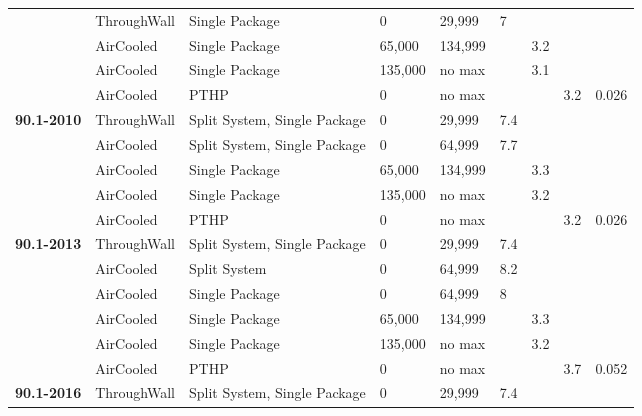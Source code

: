 \begin{table}[h!]
\begin{tabular}{|p{0.4in}|p{0.5in}|p{0.75in}|p{0.4in}|p{0.4in}|p{0.4in}|p{0.4in}|p{0.4in}|p{0.4in}|}
& ThroughWall               & Single Package                & 0       & 29,999    & 7   &     &     & \\ \cline{2-9} 
& AirCooled                 & Single Package                & 65,000  & 134,999   &     & 3.2 &     & \\ \cline{2-9} 
& AirCooled                 & Single Package                & 135,000 & no max    &     & 3.1 &     & \\ \cline{2-9} 
& AirCooled                 & PTHP                          & 0       & no max    &     &     & 3.2 & 0.026 \\ \hline
\multirow{5}{*}{\textbf{90.1-2010}} 
& ThroughWall               & Split System, Single Package  & 0 & 29,999 & 7.4 & & & \\ \cline{2-9} 
& AirCooled                 & Split System, Single Package  & 0       & 64,999    & 7.7 &     &     & \\ \cline{2-9} 
& AirCooled                 & Single Package                & 65,000  & 134,999   &     & 3.3 &     & \\ \cline{2-9} 
& AirCooled                 & Single Package                & 135,000 & no max    &     & 3.2 &     & \\ \cline{2-9} 
& AirCooled                 & PTHP                          & 0       & no max    &     &     & 3.2 & 0.026 \\ \hline
\multirow{6}{*}{\textbf{90.1-2013}} & ThroughWall & Split   System, Single Package & 0       & 29,999    & 7.4 &     &     &       \\ \cline{2-9} 
                                    & AirCooled   & Split   System                 & 0       & 64,999    & 8.2 &     &     &       \\ \cline{2-9} 
                                    & AirCooled   & Single   Package               & 0       & 64,999    & 8   &     &     &       \\ \cline{2-9} 
                                    & AirCooled   & Single   Package               & 65,000  & 134,999   &     & 3.3 &     &       \\ \cline{2-9} 
                                    & AirCooled   & Single   Package               & 135,000 & no max    &     & 3.2 &     &       \\ \cline{2-9} 
                                    & AirCooled   & PTHP                           & 0       & no max    &     &     & 3.7 & 0.052 \\ \hline
\multirow{6}{*}{\textbf{90.1-2016}} & ThroughWall & Split   System, Single Package & 0       & 29,999    & 7.4 &     &     &       \\ \cline{2-9} 

\end{tabular}
\end{table}
